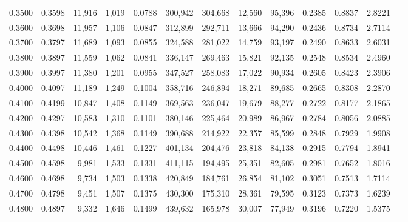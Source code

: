 \begin{tabular}{rrrrrrrrrrrrr}
0.3500 & 0.3598 & 11,916 & 1,019 &                                     0.0788 & 300,942 & 304,668 &  12,560 &  95,396 & 0.2385 & 0.8837 & 2.8221 \\
0.3600 & 0.3698 & 11,957 & 1,106 &                                     0.0847 & 312,899 & 292,711 &  13,666 &  94,290 & 0.2436 & 0.8734 & 2.7114 \\
0.3700 & 0.3797 & 11,689 & 1,093 &                                     0.0855 & 324,588 & 281,022 &  14,759 &  93,197 & 0.2490 & 0.8633 & 2.6031 \\
0.3800 & 0.3897 & 11,559 & 1,062 &                                     0.0841 & 336,147 & 269,463 &  15,821 &  92,135 & 0.2548 & 0.8534 & 2.4960 \\
0.3900 & 0.3997 & 11,380 & 1,201 &                                     0.0955 & 347,527 & 258,083 &  17,022 &  90,934 & 0.2605 & 0.8423 & 2.3906 \\
0.4000 & 0.4097 & 11,189 & 1,249 &                                     0.1004 & 358,716 & 246,894 &  18,271 &  89,685 & 0.2665 & 0.8308 & 2.2870 \\
0.4100 & 0.4199 & 10,847 & 1,408 &                                     0.1149 & 369,563 & 236,047 &  19,679 &  88,277 & 0.2722 & 0.8177 & 2.1865 \\
0.4200 & 0.4297 & 10,583 & 1,310 &                                     0.1101 & 380,146 & 225,464 &  20,989 &  86,967 & 0.2784 & 0.8056 & 2.0885 \\
0.4300 & 0.4398 & 10,542 & 1,368 &                                     0.1149 & 390,688 & 214,922 &  22,357 &  85,599 & 0.2848 & 0.7929 & 1.9908 \\
0.4400 & 0.4498 & 10,446 & 1,461 &                                     0.1227 & 401,134 & 204,476 &  23,818 &  84,138 & 0.2915 & 0.7794 & 1.8941 \\
0.4500 & 0.4598 &  9,981 & 1,533 &                                     0.1331 & 411,115 & 194,495 &  25,351 &  82,605 & 0.2981 & 0.7652 & 1.8016 \\
0.4600 & 0.4698 &  9,734 & 1,503 &                                     0.1338 & 420,849 & 184,761 &  26,854 &  81,102 & 0.3051 & 0.7513 & 1.7114 \\
0.4700 & 0.4798 &  9,451 & 1,507 &                                     0.1375 & 430,300 & 175,310 &  28,361 &  79,595 & 0.3123 & 0.7373 & 1.6239 \\
0.4800 & 0.4897 &  9,332 & 1,646 &                                     0.1499 & 439,632 & 165,978 &  30,007 &  77,949 & 0.3196 & 0.7220 & 1.5375 \\

\end{tabular}
